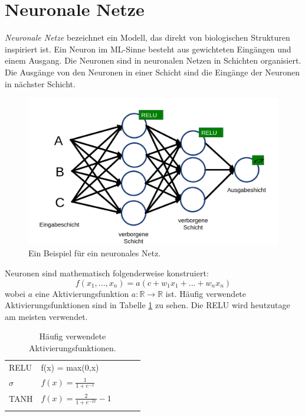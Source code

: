 \section{Neuronale Netze}
\textit{Neuronale Netze} bezeichnet ein Modell, das direkt von  biologischen Strukturen inspiriert ist. Ein Neuron im ML-Sinne  besteht aus gewichteten Eingängen und einem Ausgang. Die Neuronen sind in neuronalen Netzen in Schichten organisiert. Die Ausgänge von den Neuronen in einer Schicht sind die Eingänge der Neuronen in nächster Schicht.\\
\begin{figure}[h]
    \centering
    \includegraphics[scale=0.3]{Figures/ML-NNetz.png}
    \caption{Ein Beispiel für ein neuronales Netz. }
\end{figure}

Neuronen sind mathematisch folgenderweise konstruiert: 
\begin{equation}
    f(x_1,...,x_n) = a(c + w_1 x_1 + ... + w_n x_n)
\end{equation}
wobei $a$ eine Aktivierungsfunktion $a: \mathbb{R} \to \mathbb{R}$ ist. Häufig verwendete Aktivierungsfunktionen sind  in Tabelle \ref{ML:aktivierungsfunktionen} zu sehen. Die RELU wird heutzutage am meisten verwendet.\\

 
\begin{table}[h]
\centering
\begin{tabular}{lllll}
\cline{1-2}
\multicolumn{1}{|l|}{RELU}   & \multicolumn{1}{l|}{f(x) = max(0,x)}              &  &  &  \\ \cline{1-2}
\multicolumn{1}{|l|}{$\sigma$} & \multicolumn{1}{l|}{$f(x) = \frac{1}{1+e^{-x}}$}    &  &  &  \\ \cline{1-2}
\multicolumn{1}{|l|}{TANH}   & \multicolumn{1}{l|}{$f(x) = \frac{2}{1+e^{-2x}}-1$} &  &  &  \\ \cline{1-2}
                             &                                                   &  &  & 
\end{tabular}
\caption{Häufig verwendete Aktivierungsfunktionen.}
\label{ML:aktivierungsfunktionen}
\end{table}

